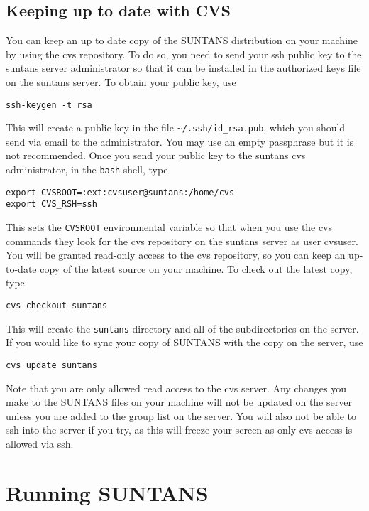 \documentclass[12pt,oneside]{article}
\begin{document}
\subsection{Keeping up to date with CVS}

You can keep an up to date copy of the SUNTANS distribution on your machine by using the
cvs repository.  To do so, you need to send your ssh public key to the suntans server administrator so that
it can be installed in the authorized keys file on the suntans server.  To obtain your
public key, use
\begin{verbatim}
ssh-keygen -t rsa
\end{verbatim}
This will create a public key in the file \verb+~/.ssh/id_rsa.pub+, which you should send
via email to the administrator.  You may use an empty passphrase but it is not recommended.
Once you send your public key to the suntans cvs administrator, in the \verb+bash+ shell, type
\begin{verbatim}
export CVSROOT=:ext:cvsuser@suntans:/home/cvs
export CVS_RSH=ssh
\end{verbatim}
This sets the \verb+CVSROOT+ environmental variable so that when you use the cvs commands
they look for the cvs repository on the suntans server as user cvsuser.
You will be granted read-only access to the cvs repository, so you can keep an up-to-date
copy of the latest source on your machine.  To check out the latest copy, type
\begin{verbatim}
cvs checkout suntans
\end{verbatim}
This will create the \verb+suntans+ directory and all of the subdirectories on the server.
If you would like to sync your copy of SUNTANS with the copy on the server, use
\begin{verbatim}
cvs update suntans
\end{verbatim}
Note that you are only allowed read access to the cvs server.  Any changes you make to
the SUNTANS files on your machine will not be updated on the server unless you are added
to the group list on the server.  You will also not be able to ssh into the server if you
try, as this will freeze your screen as only cvs access is allowed via ssh.

\section{Running {SUNTANS}}
\end{document}
